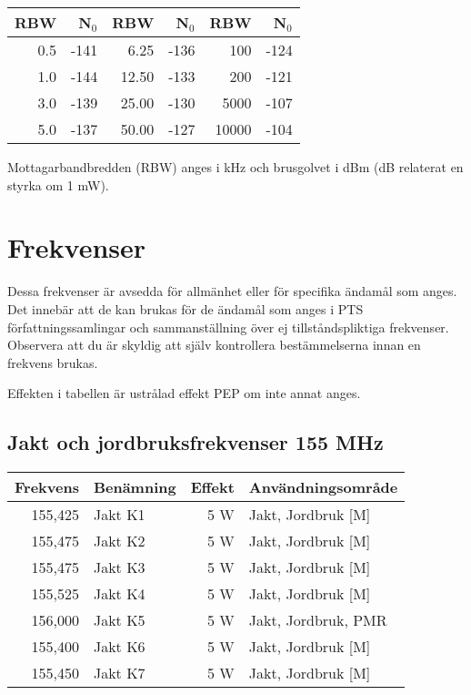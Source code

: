 \documentclass[10pt,swedish,a4paper,twoside]{article}
\begin{document}
\begin{center}
\begin{tabular}{rr|rr|rr}
	\textbf{RBW} & \textbf{N$_0$} & \textbf{RBW} & \textbf{N$_0$} & \textbf{RBW} & \textbf{N$_0$} \\ \hline
	         0.5 &           -141 &         6.25 &           -136 &          100 &           -124 \\
	         1.0 &           -144 &        12.50 &           -133 &          200 &           -121 \\
	         3.0 &           -139 &        25.00 &           -130 &         5000 &           -107 \\
	         5.0 &           -137 &        50.00 &           -127 &        10000 &           -104
\end{tabular}
\end{center}

Mottagarbandbredden (RBW) anges i kHz och brusgolvet i dBm (dB relaterat en styrka om 1 mW).

\section{Frekvenser}

Dessa frekvenser är avsedda för allmänhet eller för specifika ända\-mål som anges. Det innebär att de kan brukas för de ändamål som anges i PTS för\-fatt\-nings\-sam\-ling\-ar och sammanställning över ej tillståndspliktiga frekvenser. Observera att du är skyldig att själv kontrollera bestämmelserna innan en frekvens brukas.

Effekten i tabellen är ustrålad effekt PEP om inte annat anges.

\subsection{Jakt och jordbruksfrekvenser 155 MHz}
\begin{tabular}{rlrl}
	\textbf{Frekvens} & \textbf{Benämning} & \textbf{Effekt} & \textbf{Användningsområde} \\ \hline
	          155,425 & Jakt K1            &             5 W & Jakt, Jordbruk [M]         \\
	          155,475 & Jakt K2            &             5 W & Jakt, Jordbruk [M]         \\
	          155,475 & Jakt K3            &             5 W & Jakt, Jordbruk [M]         \\
	          155,525 & Jakt K4            &             5 W & Jakt, Jordbruk [M]         \\
	          156,000 & Jakt K5            &             5 W & Jakt, Jordbruk, PMR        \\
	          155,400 & Jakt K6            &             5 W & Jakt, Jordbruk [M]         \\
	          155,450 & Jakt K7            &             5 W & Jakt, Jordbruk [M]
\end{tabular}
\end{document}
